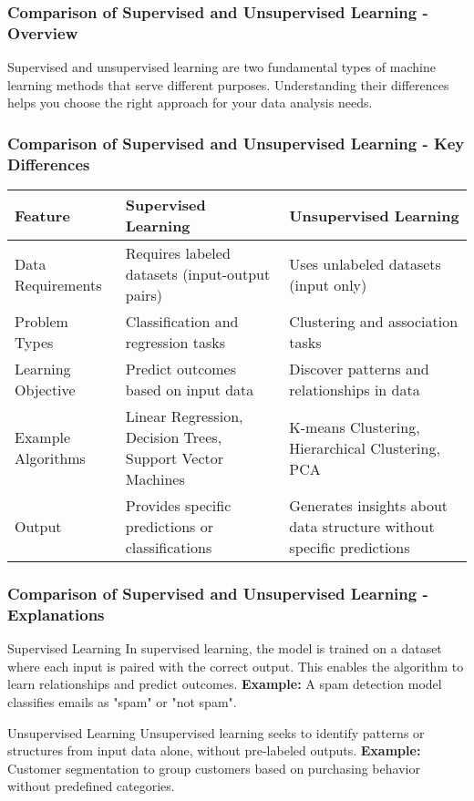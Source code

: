 \documentclass[aspectratio=169]{beamer}
\begin{document}
\begin{frame}[fragile]
    \frametitle{Comparison of Supervised and Unsupervised Learning - Overview}
    Supervised and unsupervised learning are two fundamental types of machine learning methods that serve different purposes.  
    Understanding their differences helps you choose the right approach for your data analysis needs.
\end{frame}

\begin{frame}[fragile]
    \frametitle{Comparison of Supervised and Unsupervised Learning - Key Differences}
    \begin{table}[h]
        \centering
        \begin{tabular}{|l|l|l|}
            \hline
            \textbf{Feature} & \textbf{Supervised Learning} & \textbf{Unsupervised Learning} \\
            \hline
            Data Requirements & Requires labeled datasets (input-output pairs) & Uses unlabeled datasets (input only) \\
            \hline
            Problem Types & Classification and regression tasks & Clustering and association tasks \\
            \hline
            Learning Objective & Predict outcomes based on input data & Discover patterns and relationships in data \\
            \hline
            Example Algorithms & Linear Regression, Decision Trees, Support Vector Machines & K-means Clustering, Hierarchical Clustering, PCA \\
            \hline
            Output & Provides specific predictions or classifications & Generates insights about data structure without specific predictions \\
            \hline
        \end{tabular}
    \end{table}
\end{frame}

\begin{frame}[fragile]
    \frametitle{Comparison of Supervised and Unsupervised Learning - Explanations}
    \begin{block}{Supervised Learning}
      In supervised learning, the model is trained on a dataset where each input is paired with the correct output.
      This enables the algorithm to learn relationships and predict outcomes.  
      \textbf{Example:} A spam detection model classifies emails as "spam" or "not spam".
    \end{block}
    
    \begin{block}{Unsupervised Learning}
      Unsupervised learning seeks to identify patterns or structures from input data alone, without pre-labeled outputs.  
      \textbf{Example:} Customer segmentation to group customers based on purchasing behavior without predefined categories.
    \end{block}
\end{frame}
\end{document}
